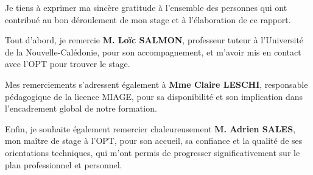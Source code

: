 \documentclass[12pt,a4paper]{report}
\begin{document}
\begin{flushleft}
Je tiens à exprimer ma sincère gratitude à l'ensemble des personnes qui ont contribué au bon déroulement de mon stage et à l'élaboration de ce rapport.

\vspace{1cm}
Tout d’abord, je remercie \textbf{M. Loïc SALMON}, professeur tuteur à l’Université de la Nouvelle-Calédonie, pour son accompagnement, et m'avoir mis en contact avec l'OPT pour trouver le stage.

\vspace{1cm}
Mes remerciements s’adressent également à \textbf{Mme Claire LESCHI}, responsable pédagogique de la licence MIAGE, pour sa disponibilité et son implication dans l’encadrement global de notre formation.

\vspace{1cm}
Enfin, je souhaite également remercier chaleureusement \textbf{M. Adrien SALES}, mon maître de stage à l’OPT, pour son accueil, sa confiance et la qualité de ses orientations techniques, qui m’ont permis de progresser significativement sur le plan professionnel et personnel.
\end{flushleft}
\end{document}
